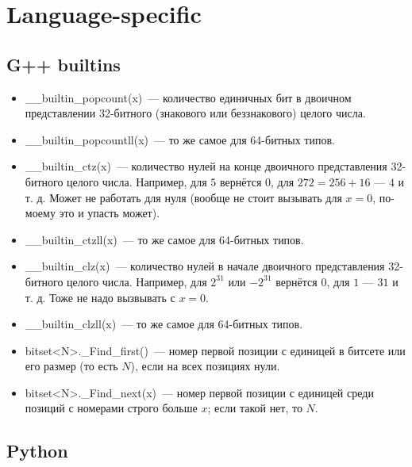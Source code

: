 \section{Language-specific}

\subsection{G++ builtins}

\begin{itemize}
\item  \_\_builtin\_popcount(x)~--- количество единичных бит в двоичном представлении 32-битного (знакового или беззнакового) целого числа.
\item \_\_builtin\_popcountll(x)~--- то же самое для 64-битных типов.
\item \_\_builtin\_ctz(x)~--- количество нулей на конце двоичного представления 32-битного целого числа. Например, для $5$ вернётся $0$, для $272 = 256 + 16$ --- $4$ и т. д. Может не работать для нуля (вообще не стоит вызывать для $x = 0$, по-моему это и упасть может).
\item \_\_builtin\_ctzll(x)~--- то же самое для 64-битных типов.
\item \_\_builtin\_clz(x)~--- количество нулей в начале двоичного представления 32-битного целого числа. Например, для $2^{31}$ или $-2^{31}$ вернётся
$0$, для $1$ --- $31$ и т. д. Тоже не надо вызвывать с $x = 0$.
\item \_\_builtin\_clzll(x)~--- то же самое для 64-битных типов.

\item bitset<N>.\_Find\_first()~--- номер первой позиции с единицей в битсете или его размер
(то есть $N$), если на всех позициях нули.
\item bitset<N>.\_Find\_next(x)~--- номер первой позиции с единицей среди позиций с номерами строго больше $x$; если такой нет, то $N$.
\end{itemize}

\subsection{Python}


